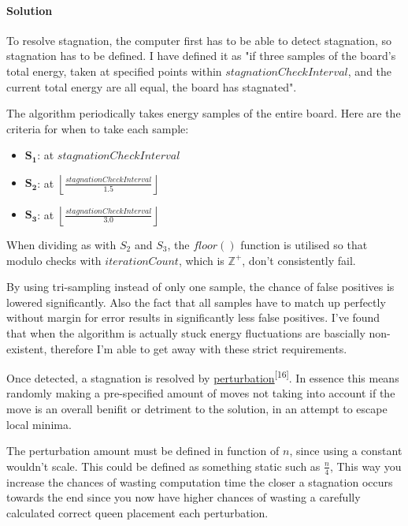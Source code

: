 \documentclass{article}
\begin{document}
\paragraph{Solution}
To resolve stagnation, the computer first has to be able to detect stagnation, so stagnation has to be defined.
I have defined it as "if three samples of the board's total energy, taken at specified points within $stagnationCheckInterval$,
and the current total energy are all equal, the board has stagnated".

The algorithm periodically takes energy samples of the entire board.
Here are the criteria for when to take each sample:

\begin{itemize}

    \item \(\mathbf{S_1}\): at \(stagnationCheckInterval\)
    \item \(\mathbf{S_2}\): at \( \left\lfloor \frac{stagnationCheckInterval}{1.5} \right\rfloor\)
    \item \(\mathbf{S_3}\): at \( \left\lfloor \frac{stagnationCheckInterval}{3.0} \right\rfloor\)
\end{itemize}

When dividing as with $S_2$ and $S_3$, the $floor()$ function is utilised so that modulo checks with
\newline $iterationCount$, which is $\mathbb{Z}^+$, don't consistently fail.

By using tri-sampling instead of only one sample, the chance of false positives is lowered significantly.
Also the fact that all samples have to match up perfectly without margin for error results in significantly less false positives.
I've found that when the algorithm is actually stuck energy fluctuations are bascially non-existent, therefore I'm able to get away with these strict requirements.

Once detected, a stagnation is resolved by \href{https://en.wikipedia.org/wiki/Perturbation_theory}{perturbation}\textsuperscript{[16]}.
In essence this means randomly making a pre-specified amount of moves not taking into account if the move is an overall benifit or detriment to the solution,
in an attempt to escape local minima.

The perturbation amount must be defined in function of $n$, since using a constant wouldn't scale.
This could be defined as something static such as $\frac{n}{4}$,
This way you increase the chances of wasting computation time the closer a stagnation occurs towards the end
since you now have higher chances of wasting a carefully calculated correct queen placement each perturbation.
\end{document}
